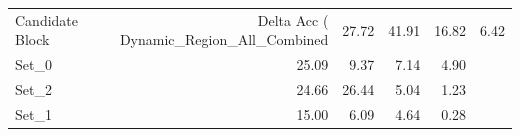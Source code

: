 \begin{tabular}{lrrrr}
\toprule
Candidate Block & Delta Acc (%
\midrule
Dynamic_Region_All_Combined & 27.72 & 41.91 & 16.82 & 6.42 \\
Set_0 & 25.09 & 9.37 & 7.14 & 4.90 \\
Set_2 & 24.66 & 26.44 & 5.04 & 1.23 \\
Set_1 & 15.00 & 6.09 & 4.64 & 0.28 \\
\bottomrule
\end{tabular}
